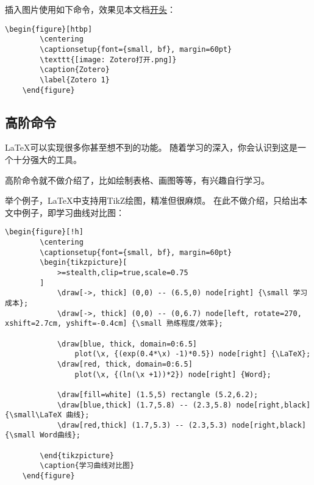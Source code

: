 插入图片使用如下命令，效果见本文档\hyperref[Zotero 1]{开头}：
\begin{center}
\begin{minipage}{0.8\textwidth}
    \hspace{1em}
\begin{lstlisting}[language={[LaTeX]TeX}]
    \begin{figure}[htbp]
        \centering
        \captionsetup{font={small, bf}, margin=60pt}
        \texttt{[image: Zotero打开.png]}
        \caption{Zotero}
        \label{Zotero 1}
    \end{figure}
\end{lstlisting}
\end{minipage}
\end{center}

\newpage

\subsection{高阶命令}

\LaTeX{}可以实现很多你甚至想不到的功能。
随着学习的深入，你会认识到这是一个十分强大的工具。

高阶命令就不做介绍了，比如绘制表格、画图等等，有兴趣自行学习。

举个例子，\LaTeX{}中支持用TikZ绘图，精准但很麻烦。
在此不做介绍，只给出本文中例子，即学习曲线对比图：
\begin{center}
\begin{minipage}{0.8\textwidth}
    \hspace{1em}
\begin{lstlisting}[language={[LaTeX]TeX}]
    \begin{figure}[!h]
        \centering
        \captionsetup{font={small, bf}, margin=60pt}
        \begin{tikzpicture}[
            >=stealth,clip=true,scale=0.75
        ]
            \draw[->, thick] (0,0) -- (6.5,0) node[right] {\small 学习成本};
            \draw[->, thick] (0,0) -- (0,6.7) node[left, rotate=270, xshift=2.7cm, yshift=-0.4cm] {\small 熟练程度/效率};
        
            \draw[blue, thick, domain=0:6.5] 
                plot(\x, {(exp(0.4*\x) -1)*0.5}) node[right] {\LaTeX};
            \draw[red, thick, domain=0:6.5] 
                plot(\x, {(ln(\x +1))*2}) node[right] {Word};
        
            \draw[fill=white] (1.5,5) rectangle (5.2,6.2);
            \draw[blue,thick] (1.7,5.8) -- (2.3,5.8) node[right,black] {\small\LaTeX 曲线};
            \draw[red,thick] (1.7,5.3) -- (2.3,5.3) node[right,black] {\small Word曲线};
        
        \end{tikzpicture} 
        \caption{学习曲线对比图} 
    \end{figure} 
\end{lstlisting}
\end{minipage}
\end{center}

